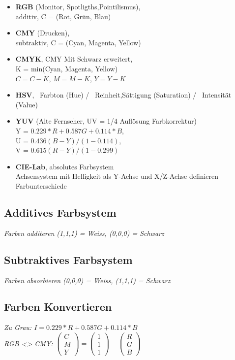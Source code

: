 \begin{itemize}
    \item \textbf{RGB} (Monitor, Spotligths,Pointilismus), \\
          additiv, C = (Rot, Grün, Blau)
    \item \textbf{CMY} (Drucken), \\
          subtraktiv, C = (Cyan, Magenta, Yellow)
    \item \textbf{CMYK}, CMY Mit Schwarz erweitert, \\
          K = min(Cyan, Magenta, Yellow) \\
          $C = C - K$, $M = M - K$, $Y = Y - K$
    \item \textbf{HSV}, \
          Farbton (Hue) / \
          Reinheit,Sättigung (Saturation) / \
          Intensität (Value)
    \item \textbf{YUV} (Alte Fernseher, UV = 1/4 Auflösung Farbkorrektur)\\
          Y = $0.229*R+0.587G+0.114*B$, \\
          U = $0.436(B-Y)/(1-0.114)$, \\
          V = $0.615(R-Y)/(1-0.299)$
    \item \textbf{CIE-Lab}, absolutes Farbsystem \\
          Achsensystem mit Helligkeit als Y-Achse und X/Z-Achse definieren Farbunterschiede
\end{itemize}

\subsection{Additives Farbsystem}

\textit{Farben additeren}
\textit{(1,1,1) = Weiss, (0,0,0) = Schwarz}

\subsection{Subtraktives Farbsystem}

\textit{Farben absorbieren}
\textit{(0,0,0) = Weiss, (1,1,1) = Schwarz}

\subsection{Farben Konvertieren}

\textit{Zu Grau: $I = 0.229*R+0.587G+0.114*B$} \\

\textit{RGB <> CMY: }
$\begin{pmatrix} C \\ M \\ Y \end{pmatrix} =
\begin{pmatrix} 1 \\ 1 \\ 1 \end{pmatrix} -
\begin{pmatrix} R \\ G \\ B \end{pmatrix}$ \\

